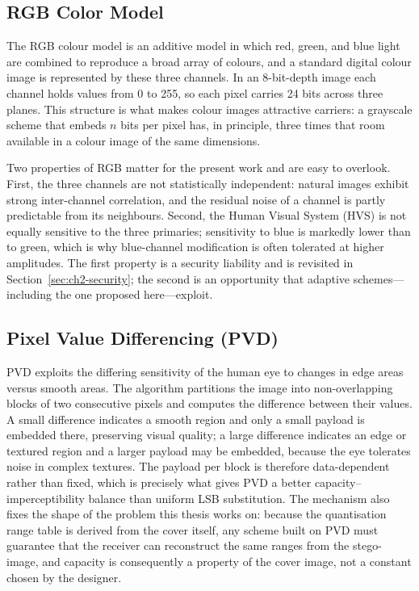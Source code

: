 \subsection{RGB Color Model}
The RGB colour model is an additive model in which red, green, and blue light are combined to reproduce a broad array of colours, and a standard digital colour image is represented by these three channels. In an 8-bit-depth image each channel holds values from 0 to 255, so each pixel carries 24 bits across three planes. This structure is what makes colour images attractive carriers: a grayscale scheme that embeds $n$ bits per pixel has, in principle, three times that room available in a colour image of the same dimensions.

Two properties of RGB matter for the present work and are easy to overlook. First, the three channels are not statistically independent: natural images exhibit strong inter-channel correlation, and the residual noise of a channel is partly predictable from its neighbours. Second, the Human Visual System (HVS) is not equally sensitive to the three primaries; sensitivity to blue is markedly lower than to green, which is why blue-channel modification is often tolerated at higher amplitudes. The first property is a security liability and is revisited in Section~\ref{sec:ch2-security}; the second is an opportunity that adaptive schemes---including the one proposed here---exploit.

\subsection{Pixel Value Differencing (PVD)}
PVD exploits the differing sensitivity of the human eye to changes in edge areas versus smooth areas. The algorithm partitions the image into non-overlapping blocks of two consecutive pixels and computes the difference between their values. A small difference indicates a smooth region and only a small payload is embedded there, preserving visual quality; a large difference indicates an edge or textured region and a larger payload may be embedded, because the eye tolerates noise in complex textures. The payload per block is therefore data-dependent rather than fixed, which is precisely what gives PVD a better capacity--imperceptibility balance than uniform LSB substitution. The mechanism also fixes the shape of the problem this thesis works on: because the quantisation range table is derived from the cover itself, any scheme built on PVD must guarantee that the receiver can reconstruct the same ranges from the stego-image, and capacity is consequently a property of the cover image, not a constant chosen by the designer.

